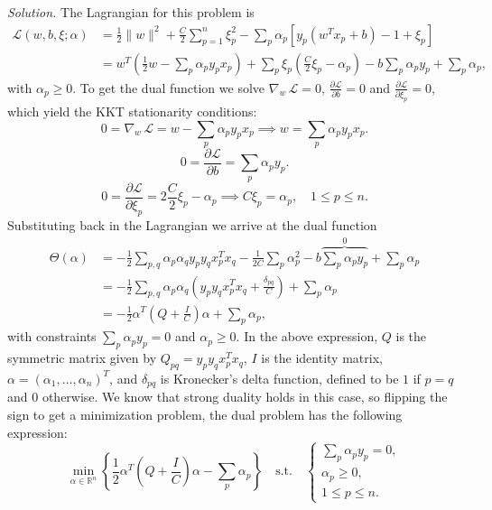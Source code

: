 \documentclass[11pt]{article}
\begin{document}
\textit{Solution.} The Lagrangian for this problem is
\begin{align*}
\mathcal L(w, b, \xi; \alpha)&=\frac{1}{2}\|w\|^2 + \frac{C}{2}\sum_{p=1}^n \xi_p^2 - \sum_{p} \alpha_p[y_p(w^Tx_p+b)-1+\xi_p]\\
&= w^T\left(\frac{1}{2}w - \sum_p \alpha_p y_px_p\right) + \sum_p \xi_p\left(\frac{C}{2}\xi_p - \alpha_p\right) - b\sum_p \alpha_p y_p + \sum_p \alpha_p,
\end{align*}
with $\alpha_p\geq 0$. To get the dual function we solve $\nabla_w\, \mathcal L = 0$, $\frac{\partial \mathcal L}{\partial b}=0$ and $\frac{\partial \mathcal L}{\partial \xi_p}=0$, which yield the KKT stationarity conditions:
\begin{equation}
  \label{eq:kkt1}
0=\nabla_w\, \mathcal L = w - \sum_p \alpha_p y_px_p \implies w = \sum_p \alpha_p y_px_p.
\end{equation}
\begin{equation}
    \label{eq:kkt2}
0=\frac{\partial \mathcal L}{\partial b} = \sum_{p} \alpha_p y_p.
\end{equation}
\begin{equation}
    \label{eq:kkt3}
0=\frac{\partial \mathcal L}{\partial \xi_p} = 2\frac{C}{2}\xi_p - \alpha_p \implies C\xi_p = \alpha_p, \quad 1\leq p \leq n.
\end{equation}
Substituting back in the Lagrangian we arrive at the dual function
\begin{align*}
\Theta(\alpha)&= -\frac{1}{2} \sum_{p, q}\alpha_p \alpha_q y_p y_q x_p^T x_q - \frac{1}{2C}\sum_p \alpha_p^2 - b \overbrace{\sum_p \alpha_py_p}^{0} + \sum_p \alpha_p\\
&= -\frac{1}{2} \sum_{p, q}\alpha_p \alpha_q  \left(y_p y_qx_p^T x_q + \frac{\delta_{pq}}{C}\right) + \sum_p \alpha_p\\
&= -\frac{1}{2}\alpha^T\left(Q+ \frac{I}{C}\right)\alpha + \sum_p \alpha_p,
\end{align*}
with constraints $\sum_p \alpha_p y_p=0$ and $\alpha_p\geq 0$. In the above expression, $Q$ is the symmetric matrix given by $Q_{pq}=y_py_qx_p^Tx_q$, $I$ is the identity matrix, $\alpha=(\alpha_1,\dots,\alpha_n)^T$, and $\delta_{pq}$ is Kronecker's delta function, defined to be $1$ if $p=q$ and $0$ otherwise. We know that strong duality holds in this case, so flipping the sign to get a minimization problem, the dual problem has the following expression:
\[
\min_{\alpha\in\mathbb R^n} \left\{\frac{1}{2}\alpha^T\left(Q+ \frac{I}{C}\right)\alpha - \sum_p \alpha_p\right\} \quad \text{s.t.} \quad \begin{cases}
\displaystyle \sum_p \alpha_p y_p=0,\\
  \alpha_p\geq 0,\\
  1\leq p \leq n.
\end{cases}
\]
\end{document}
